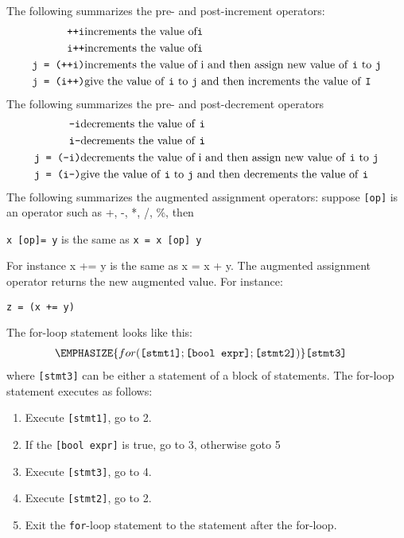 \begin{console}
\begin{console}
\newpage{}

The following summarizes the pre- and post-increment operators:
\begin{align*}
\texttt{++i} &\text{increments the value of} \texttt{i}\\
\texttt{i++} &\text{increments the value of} \texttt{i}\\
\texttt{j = (++i)} &\text{increments the value of i and then assign new value of
\texttt{i} to \texttt{j}}\\
\texttt{j = (i++)} &\text{give the value of \texttt{i} to \texttt{j} and then
increments the value of \texttt{I}}\\
\end{align*}
The following summarizes the pre- and post-decrement operators
\begin{align*}
\texttt{--i} &\text{decrements the value of \texttt{i}}\\
\texttt{i--} &\text{decrements the value of \texttt{i}}\\
\texttt{j = (--i)} &\text{decrements the value of i and then assign new value
of \texttt{i} to \texttt{j}}\\
\texttt{j = (i--)} &\text{give the value of \texttt{i} to \texttt{j} and then
decrements the value of \texttt{i}}\\
\end{align*}
The following summarizes the augmented assignment operators: suppose
\texttt{[op]} is an operator such as +, -, *, /, \%, then
\begin{center}
\texttt{x [op]= y}     is the same as      \texttt{x = x [op] y}
\end{center}
For instance x += y is the same as x = x + y. The augmented assignment
operator returns the new augmented value. For instance:
\begin{center}
\texttt{z = (x += y)}
\end{center}
The for-loop statement looks like this:
\begin{align*}
\EMPHASIZE{for (\texttt{[stmt1]}; \texttt{[bool expr]}; \texttt{[stmt2]})}
&\texttt{[stmt3]}
\end{align*}
where \texttt{[stmt3]} can be either a statement of a block of
statements. The for-loop statement executes as follows:

\begin{enumerate}
\item
  Execute \texttt{[stmt1]}, go to 2.
\item
  If the \texttt{[bool expr]} is true, go to 3, otherwise goto 5
\item
  Execute \texttt{[stmt3]}, go to 4.
\item
  Execute \texttt{[stmt2]}, go to 2.
\item
  Exit the \texttt{for}-loop statement to the statement after the for-loop.
\end{enumerate}


\end{console}
\end{console}

